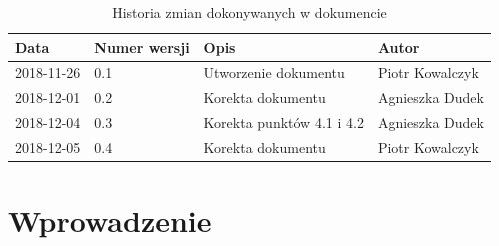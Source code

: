 \documentclass{article}
\begin{document}
\begin{titlepage}






\end{titlepage}

\addtocounter{page}{1}
\newpage

\begin{table}[h!]
	\begin{center}
		\caption{Historia zmian dokonywanych w dokumencie}
		\begin{tabular}{|l|l|l|l|}
			\hline
			Data & Numer wersji & Opis & Autor \\
			\hline \hline
			2018-11-26 & 0.1 & Utworzenie dokumentu & Piotr Kowalczyk \\
			\hline 
			2018-12-01 & 0.2 & Korekta dokumentu & Agnieszka Dudek \\
			\hline
			2018-12-04 & 0.3 & Korekta punktów 4.1 i 4.2 & Agnieszka Dudek \\
			\hline
			2018-12-05 & 0.4 & Korekta dokumentu & Piotr Kowalczyk \\
			\hline
    \end{tabular}
	\end{center}
\end{table}	

\tableofcontents

\newpage


\section{Wprowadzenie}
\end{document}
